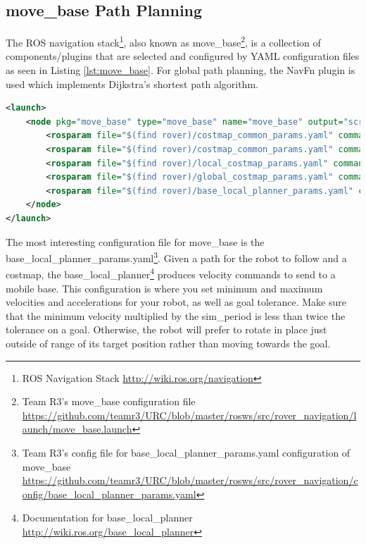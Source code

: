 \documentclass[runningheads,a4paper]{llncs}
\begin{document}
\subsection{move\_base Path Planning}
The ROS navigation stack\footnote{ROS Navigation Stack \url{http://wiki.ros.org/navigation}}, also known as move\_base\footnote{Team R3's move\_base configuration file \url{https://github.com/teamr3/URC/blob/master/rosws/src/rover_navigation/launch/move_base.launch}}, is a collection of components/plugins that are selected and configured by YAML configuration files as seen in Listing \ref{lst:move_base}. For global path planning, the NavFn plugin is used which implements Dijkstra's shortest path algorithm.

\begin{lstlisting}[language=XML,frame=single,basicstyle=\ttfamily\footnotesize,breaklines=true,captionpos=b,label={lst:move_base},caption={move\_base is configured by independent YAML files that configure the subcomponents of move\_base.}]
<launch>
    <node pkg="move_base" type="move_base" name="move_base" output="screen" clear_params="true">
        <rosparam file="$(find rover)/costmap_common_params.yaml" command="load" ns="global_costmap"/>
        <rosparam file="$(find rover)/costmap_common_params.yaml" command="load" ns="local_costmap"/>
        <rosparam file="$(find rover)/local_costmap_params.yaml" command="load"/>
        <rosparam file="$(find rover)/global_costmap_params.yaml" command="load"/>
        <rosparam file="$(find rover)/base_local_planner_params.yaml" command="load"/>
    </node>
</launch>
\end{lstlisting}


The most interesting configuration file for move\_base is the base\_local\_planner\_params.yaml\footnote{Team R3's config file for base\_local\_planner\_params.yaml configuration of move\_base \url{https://github.com/teamr3/URC/blob/master/rosws/src/rover_navigation/config/base_local_planner_params.yaml}}. Given a path for the robot to follow and a costmap, the base\_local\_planner\footnote{Documentation for base\_local\_planner \url{http://wiki.ros.org/base_local_planner}} produces velocity commands to send to a mobile base. This configuration is where you set minimum and maximum velocities and accelerations for your robot, as well as goal tolerance. Make sure that the minimum velocity multiplied by the sim\_period is less than twice the tolerance on a goal. Otherwise, the robot will prefer to rotate in place just outside of range of its target position rather than moving towards the goal.
\end{document}

